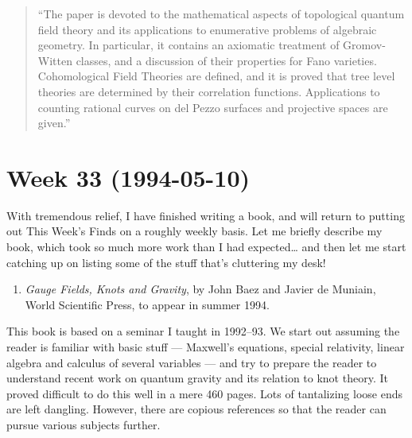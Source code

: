 \documentclass{article}
\def\tightlist{}
\begin{document}
\begin{quote}
``The paper is devoted to the mathematical aspects of topological
quantum field theory and its applications to enumerative problems of
algebraic geometry. In particular, it contains an axiomatic treatment of
Gromov-Witten classes, and a discussion of their properties for Fano
varieties. Cohomological Field Theories are defined, and it is proved
that tree level theories are determined by their correlation functions.
Applications to counting rational curves on del Pezzo surfaces and
projective spaces are given.''
\end{quote}
\hypertarget{week33}{%
\section{Week 33 (1994-05-10)}\label{week33}}

With tremendous relief, I have finished writing a book, and will return
to putting out This Week's Finds on a roughly weekly basis. Let me
briefly describe my book, which took so much more work than I had
expected\ldots{} and then let me start catching up on listing some of
the stuff that's cluttering my desk!

\begin{enumerate}
\def\labelenumi{\arabic{enumi})}
\tightlist
\item
  \emph{Gauge Fields, Knots and Gravity}, by John Baez and Javier de
  Muniain, World Scientific Press, to appear in summer 1994.
\end{enumerate}

This book is based on a seminar I taught in 1992--93. We start out
assuming the reader is familiar with basic stuff --- Maxwell's
equations, special relativity, linear algebra and calculus of several
variables --- and try to prepare the reader to understand recent work on
quantum gravity and its relation to knot theory. It proved difficult to
do this well in a mere 460 pages. Lots of tantalizing loose ends are
left dangling. However, there are copious references so that the reader
can pursue various subjects further.
\end{document}
